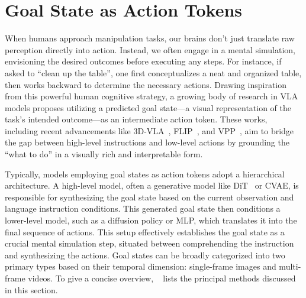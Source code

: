 \documentclass[10pt, a4paper, logo, copyright]{googledeepmind} %
\begin{document}
\section{Goal State as Action Tokens}
\label{sec:goal-state}

When humans approach manipulation tasks, our brains don't just translate raw perception directly into action. Instead, we often engage in a mental simulation, envisioning the desired outcomes before executing any steps. For instance, if asked to ``clean up the table'', one first conceptualizes a neat and organized table, then works backward to determine the necessary actions. Drawing inspiration from this powerful human cognitive strategy, a growing body of research in VLA models proposes utilizing a predicted goal state---a visual representation of the task's intended outcome---as an intermediate action token. These works, including recent advancements like 3D-VLA~\cite{zhen20243d}, FLIP~\cite{flip}, and VPP~\cite{hu2025videopredictionpolicygeneralist}, aim to bridge the gap between high-level instructions and low-level actions by grounding the ``what to do'' in a visually rich and interpretable form. 

Typically, models employing goal states as action tokens adopt a hierarchical architecture. A high-level model, often a generative model like DiT~\citep{peebles2023scalable} or CVAE, is responsible for synthesizing the goal state based on the current observation and language instruction conditions. This generated goal state then conditions a lower-level model, such as a diffusion policy or MLP, which translates it into the final sequence of actions. This setup effectively establishes the goal state as a crucial mental simulation step, situated between comprehending the instruction and synthesizing the actions. 
Goal states can be broadly categorized into two primary types based on their temporal dimension: single-frame images and multi-frame videos. 
To give a concise overview, ~ lists the principal methods discussed in this section.



\end{document}
